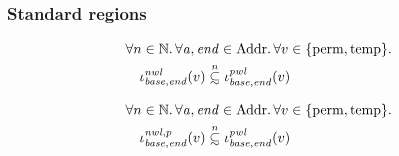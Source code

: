 \documentclass[a4paper]{article}
\newcommand\subsetsim{\mathrel{\ooalign{\raise.2ex\hbox{$\subset$}\cr
      \hidewidth\lower.8ex\hbox{\scalebox{0.9}{$\sim$}}\hidewidth\cr}}}
\newcommand{\nsubsim}[1][n]{\stackrel{\tiny{#1}}{\subsetsim}}
\newcommand{\var}[1]{\mathit{#1}}
\newcommand{\addr}{\var{a}}
\newcommand{\start}{\var{base}}
\newcommand{\addrend}{\var{end}}
\newcommand{\nwl}{\var{nwl}}
\newcommand{\pwl}{\var{pwl}}
\newcommand{\plaindom}[1]{\mathrm{#1}}
\newcommand{\Addrs}{\plaindom{Addr}}
\newcommand{\nats}{\mathbb{N}}
\newcommand{\plainview}[1]{\mathrm{#1}}
\newcommand{\perma}{\plainview{perm}}
\newcommand{\temp}{\plainview{temp}}
\begin{document}
\subsubsection{Standard regions}
\begin{lemma}
  \label{lem:nwl-subset-pwl}
  \begin{align*}
    & \forall n \in \nats\ldotp \forall \addr, \addrend \in \Addrs \ldotp \forall v \in \{\perma, \temp\} \ldotp \\
    & \quad \iota^\nwl_{\start,\addrend} (v) \nsubsim \iota^\pwl_{\start,\addrend}(v)
  \end{align*}
\end{lemma}
\begin{lemma}
  \label{lem:nwlp-subset-pwl}
  \begin{align*}
    & \forall n \in \nats\ldotp \forall \addr, \addrend \in \Addrs \ldotp \forall v \in \{\perma, \temp\} \ldotp \\
    & \quad \iota^{\nwl,p}_{\start,\addrend} (v) \nsubsim \iota^\pwl_{\start,\addrend}(v)
  \end{align*}
\end{lemma}
\end{document}
